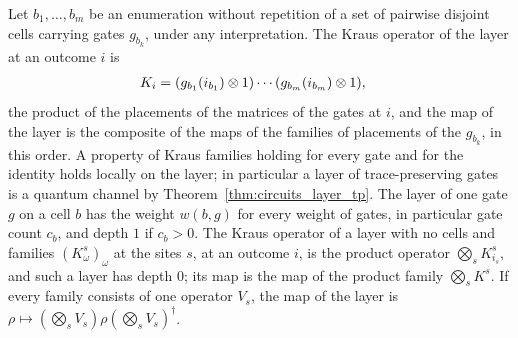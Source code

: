 \begin{theorem}
    \label{thm:circuits_of_cells}
    \leanok
    Let $b_1,\dots,b_m$ be an enumeration without repetition of a set of pairwise
    disjoint cells carrying gates $g_{b_k}$, under any interpretation. The Kraus
    operator of the layer at an outcome $i$ is
    \begin{align}
        K_i&=(g_{b_1}(i_{b_1})\otimes1)\cdots(g_{b_m}(i_{b_m})\otimes1),
        \notag
    \end{align}
    the product of the placements of the matrices of the gates at $i$, and the map of
    the layer is the composite of the maps of the families of placements of the
    $g_{b_k}$, in this order. A property of Kraus families holding for every gate and
    for the identity holds locally on the layer; in particular a layer of
    trace-preserving gates is a quantum channel by Theorem~\ref{thm:circuits_layer_tp}.
    The layer of one gate $g$ on a cell $b$ has the weight $w(b,g)$ for every weight
    of gates, in particular gate count $c_b$, and depth $1$ if $c_b>0$. The Kraus
    operator of a layer with no cells and families $(K^s_\omega)_\omega$ at the sites
    $s$, at an outcome $i$, is the product operator $\bigotimes_sK^s_{i_s}$, and such a layer
    has depth $0$; its map is the map of the product family $\bigotimes_sK^s$. If every
    family consists of one operator $V_s$, the map of the layer is
    $\rho\mapsto(\bigotimes_sV_s)\rho(\bigotimes_sV_s)^\dagger$.
\end{theorem}
